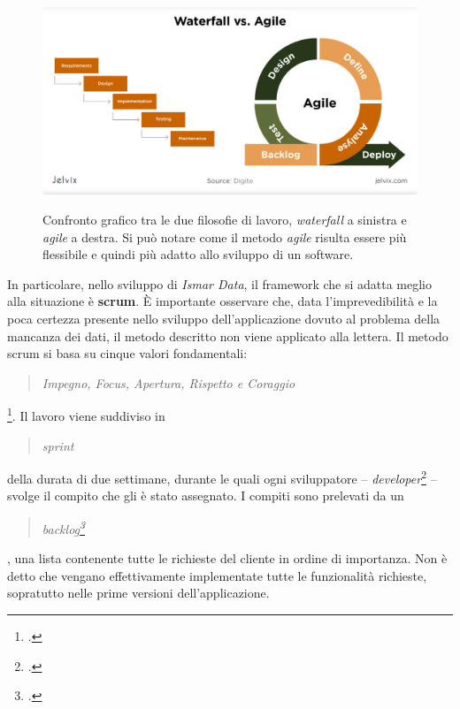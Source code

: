 \documentclass[./main.tex]{subfiles}
\begin{document}
\begin{figure}[!ht]
\noindent\begin{minipage}{0.6\textwidth}
\vspace{1cm}
\includegraphics[width=\textwidth]{images/waterfall-vs-agile.pdf}
\captionsetup{font=small, hypcap=false}
\label{fig:waterfall_vs_agile}
\end{minipage}
\hspace{0.05\textwidth}
\begin{minipage}{0.3\textwidth}
\begin{small}
Confronto grafico tra le due filosofie di lavoro, \textit{waterfall} a sinistra e \textit{agile} a destra. Si può notare come il metodo \textit{agile} risulta essere più flessibile e quindi più adatto allo sviluppo di un software.
\end{small}
\end{minipage}
\vspace{0.25cm}
\end{figure}

In particolare, nello sviluppo di \textit{Ismar Data}, il framework che si adatta meglio alla situazione è \textbf{scrum}. È importante osservare che, data l'imprevedibilità e la poca certezza presente nello sviluppo dell'applicazione dovuto al problema della mancanza dei dati, il metodo descritto non viene applicato alla lettera. Il metodo scrum si basa su cinque valori fondamentali: \blockquote{\textit{Impegno, Focus, Apertura, Rispetto e Coraggio}}\footcite[4]{scrum-guide-ita}. Il lavoro viene suddiviso in \blockquote{\textit{sprint}} della durata di due settimane, durante le quali ogni sviluppatore -- \textit{developer}\footcite[5-6]{scrum-guide-ita} -- svolge il compito che gli è stato assegnato. I compiti sono prelevati da un \blockquote{\textit{backlog\footcite[11]{scrum-guide-ita}}}, una lista contenente tutte le richieste del cliente in ordine di importanza. Non è detto che vengano effettivamente implementate tutte le funzionalità richieste, sopratutto nelle prime versioni dell'applicazione.\par
\end{document}
